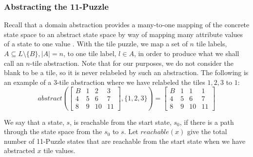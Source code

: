 \documentclass{article}
\begin{document}
\subsubsection*{Abstracting the 11-Puzzle}

Recall that a domain abstraction provides a many-to-one mapping of the concrete state space to an
abstract state space by way of mapping many attribute values of a state to one value \cite{helmert2007flexible}.
With the tile puzzle, we map a set of \( n \) tile labels, \(A \subseteq L \setminus \{B\}, |A| = n\), to one tile label, \(l \in A\),
in order to produce what we shall call an \( n \)-tile abstraction.
Note that for our purposes, we do not consider the blank to be a tile, so it is never relabeled by such an abstraction.
The following is an example of a \( 3 \)-tile abstraction where we have relabeled the tiles \( 1, 2, 3 \)
to \( 1 \):
\[
abstract(
\begin{bmatrix}
B & 1 & 2 & 3 \\
4 & 5 & 6 & 7 \\
8 & 9 & 10 & 11
\end{bmatrix}
, \{1, 2, 3 \}
)
=
\begin{bmatrix}
B & 1 & 1 & 1 \\
4 & 5 & 6 & 7 \\
8 & 9 & 10 & 11
\end{bmatrix}
\]

We say that a state, \( s \), is reachable from the start state, \( s_0 \),
if there is a path through the state space from the \( s_0 \) to \( s \).
Let \( reachable(x) \) give the total number of 11-Puzzle states
that are reachable from the start state when we
have abstracted \( x \) tile values. \\
\end{document}
